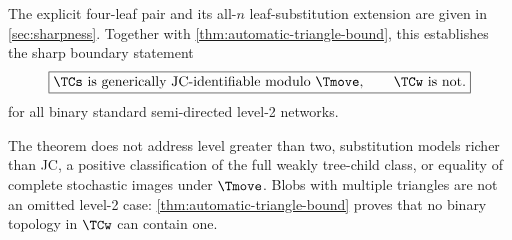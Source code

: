 The explicit four-leaf pair and its all-$n$ leaf-substitution extension are given in \cref{sec:sharpness}.  Together with \cref{thm:automatic-triangle-bound}, this establishes the sharp boundary statement
\[
\boxed{
\TCs\text{ is generically JC-identifiable modulo }\Tmove,
\qquad
\TCw\text{ is not.}
}
\]
for all binary standard semi-directed level-2 networks.

\begin{remark}[Scope]
The theorem does not address level greater than two, substitution models richer than JC, a positive classification of the full weakly tree-child class, or equality of complete stochastic images under $\Tmove$.  Blobs with multiple triangles are not an omitted level-2 case: \cref{thm:automatic-triangle-bound} proves that no binary topology in $\TCw$ can contain one.
\end{remark}

